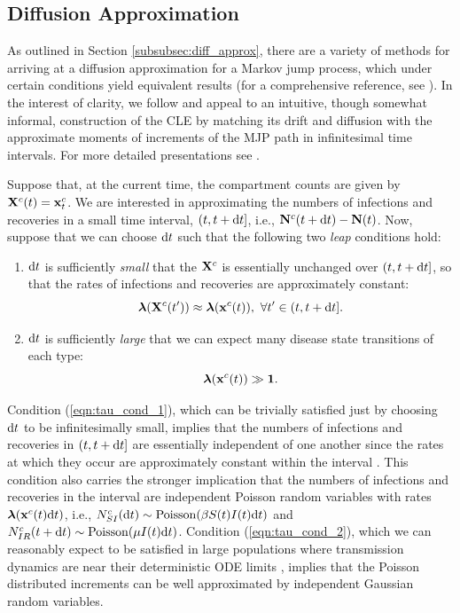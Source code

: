 \subsection{Diffusion Approximation}
\label{subsec:diff_approx}

As outlined in Section \ref{subsubsec:diff_approx}, there are a variety of methods for arriving at a diffusion approximation for a Markov jump process, which under certain conditions yield equivalent results (for a comprehensive reference, see \cite{fuchs2013inference}). In the interest of clarity, we follow \cite{fearnhead2014,golightly2013simulation,golightly2015delayed,wilkinson2011stochastic} and appeal to an intuitive, though somewhat informal, construction of the CLE by matching its drift and diffusion with the approximate moments of increments of the MJP path in infinitesimal time intervals. For more detailed presentations see \cite{fuchs2013inference,gillespie2000chemical,wallace2012linear}. 

Suppose that, at the current time, the compartment counts are given by $ \mathbf{X}^c(t) = \mathbf{x}^c_t $. We are interested in approximating the numbers of infections and recoveries in a small time interval, $ (t, t+\mathrm{d} t] $, i.e., $ \mathbf{N}^c(t+\mathrm{d} t) - \mathbf{N}(t)$. Now, suppose that we can choose $ \mathrm{d} t $ such that the following two \textit{leap} conditions hold:

\begin{enumerate}
	\item $ \mathrm{d} t $ is sufficiently \textit{small} that the $ \mathbf{X}^c $ is essentially unchanged over $ (t,t+\mathrm{d} t] $, so that the rates of infections and recoveries are approximately constant: 
	\begin{equation}\label{eqn:tau_cond_1}
	\boldsymbol{\lambda}(\mathbf{X}^c(t^\prime)) \approx \boldsymbol{\lambda}(\mathbf{x}^c(t)),\ \forall t^\prime \in (t,t+\mathrm{d} t].
	\end{equation}
	\item $ \mathrm{d} t $ is sufficiently \textit{large} that we can expect many disease state transitions of each type:
	\begin{equation}\label{eqn:tau_cond_2}
	\boldsymbol{\lambda}(\mathbf{x}^c(t)) \gg \boldsymbol{1}.
	\end{equation}
\end{enumerate}

Condition (\ref{eqn:tau_cond_1}), which can be trivially satisfied just by choosing $ \mathrm{d} t $ to be infinitesimally small, implies that the numbers of infections and recoveries in $ (t,t+\mathrm{d} t] $ are essentially independent of one another since the rates at which they occur are approximately constant within the interval \cite{gillespie2000chemical}. This condition also carries the stronger implication that the numbers of infections and recoveries in the interval are independent Poisson random variables with rates $ \boldsymbol{\lambda}(\mathbf{x}^c(t)\mathrm{d} t) $, i.e., $ N^c_{SI}(\mathrm{d} t) \sim \mathrm{Poisson}(\beta S(t)I(t)\mathrm{d} t) $ and $ N^c_{IR}(t+\mathrm{d} t) \sim \mathrm{Poisson}(\mu I(t)\mathrm{d} t) $. Condition (\ref{eqn:tau_cond_2}), which we can reasonably expect to be satisfied in large populations where transmission dynamics are near their deterministic ODE limits \cite{wallace2012linear}, implies that the Poisson distributed increments can be well approximated by independent Gaussian random variables. 

